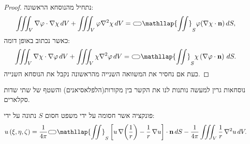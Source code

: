 \documentclass{tstextbook}
\begin{document}
\begin{proof}
נתחיל מהנוסחא הראשונה:
$$\iiint_{V}\nabla\varphi\cdot\nabla\chi\,d V+\iiint_{V}\varphi\nabla^{2}\chi\,d V={\subset\!\supset} \mathllap{\iint}_{S}\varphi(\nabla\chi\cdot\mathbf{n})\,d S,$$
כאשר נכתוב באופן דומה:
$$\iiint_{V}\nabla\chi\cdot\nabla\varphi\,d V+\iiint_{V}\chi\nabla^{2}\varphi\,d V={\subset\!\supset} \mathllap{\iint}_{S}\chi\left( \nabla\varphi\cdot\mathbf{n} \right)\,d S.$$
כעת אם נחסיר את המשוואה השנייה מהראשונה נקבל את הנוסחא השנייה.

\end{proof}
\begin{remark}
נוסחאות גרין למעשה נותנות לנו את הקשר בין מקורות(הלפלאסיאנים) והשטף של שתי שדות סקלארים.

\end{remark}
\begin{corollary}
פונקציה אשר חסומה על ידי משפט חסום \(S\) נתונה על ידי:
$$u\left( \xi,\eta,\zeta \right)={\frac{1}{4\pi}}{\subset\!\supset} \mathllap{\iint}_{S}\left[u\,\nabla\!\left({\frac{1}{r}}\right)-{\frac{1}{r}}\,\nabla u\right]\cdot\mathbf{n}\,d S-{\frac{1}{4\pi}}\iiint_{V}{\frac{1}{r}}\,\nabla^{2}u\,d V.$$

\end{corollary}
\end{document}
